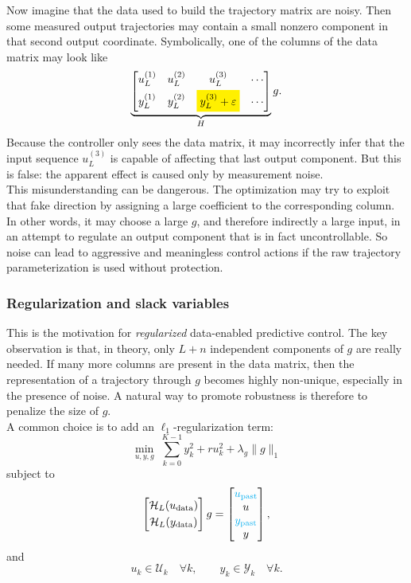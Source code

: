 Now imagine that the data used to build the trajectory matrix are noisy. Then some measured output trajectories may contain a small nonzero component in that second output coordinate. Symbolically, one of the columns of the data matrix may look like
\[
\underbrace{
\begin{bmatrix}
u^{(1)}_{L} & u^{(2)}_{L} & u^{(3)}_{L} & \cdots\\[1mm]
y^{(1)}_{L} & y^{(2)}_{L} & \colorbox{yellowblock}{$\displaystyle y^{(3)}_{L}+\varepsilon$} & \cdots
\end{bmatrix}}_{H}g.
\]
Because the controller only sees the data matrix, it may incorrectly infer that the input sequence \(u^{(3)}_{L}\) is capable of affecting that last output component. But this is false: the apparent effect is caused only by measurement noise.\\

This misunderstanding can be dangerous. The optimization may try to exploit that fake direction by assigning a large coefficient to the corresponding column. In other words, it may choose a large \(g\), and therefore indirectly a large input, in an attempt to regulate an output component that is in fact uncontrollable. So noise can lead to aggressive and meaningless control actions if the raw trajectory parameterization is used without protection.\\
\subsubsection{Regularization and slack variables}
This is the motivation for \emph{regularized} data-enabled predictive control. The key observation is that, in theory, only \(L+n\) independent components of \(g\) are really needed. If many more columns are present in the data matrix, then the representation of a trajectory through \(g\) becomes highly non-unique, especially in the presence of noise. A natural way to promote robustness is therefore to penalize the size of \(g\).\\

A common choice is to add an \(\ell_1\)-regularization term:
\[
\min_{u,y,g}\;\sum_{k=0}^{K-1} y_k^2 + r u_k^2 + \lambda_g \|g\|_1
\]
subject to
\[
\begin{bmatrix}
\mathcal{H}_L(u_{\mathrm{data}})\\[1mm]
\mathcal{H}_L(y_{\mathrm{data}})
\end{bmatrix}g
=
\begin{bmatrix}
\textcolor{cyan}{u_{\mathrm{past}}}\\
u\\
\textcolor{cyan}{y_{\mathrm{past}}}\\
y
\end{bmatrix},
\]
and
\[
u_k\in\mathcal{U}_k \quad \forall k,
\qquad
y_k\in\mathcal{Y}_k \quad \forall k.
\]

